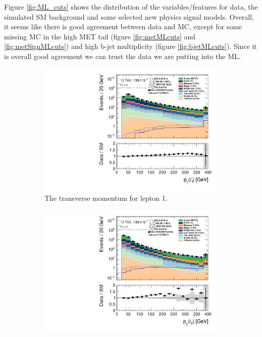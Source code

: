 Figure \ref{fig:ML_cuts} shows the distribution of the variables/features for data, the simulated SM background and some selected new physics signal models.  Overall, it seems like there is good agreement between data and MC, except for some missing MC in the high MET tail (figure \ref{fig:metMLcuts} and \ref{fig:metSignMLcuts}) and high b-jet multiplicity (figure \ref{fig:bjetMLcuts}). Since it is overall good agreement we can trust the data we are putting into the ML.

\begin{figure}[H]
\centering
    \begin{subfigure}[t!]{0.49\textwidth}
        \includegraphics[width=\textwidth]{Figures/ML_cuts/hist1d_lepPt[0]_ML_cuts.pdf}
    \caption{The transverse momentum for lepton 1.}
    \label{fig:my_label}
    \end{subfigure}
    \begin{subfigure}[t!]{0.49\textwidth}
        \includegraphics[width=\textwidth]{Figures/ML_cuts/hist1d_lepPt[1]_ML_cuts.pdf}

\end{subfigure}
\end{figure}
